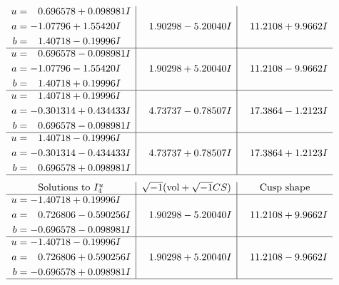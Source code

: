 \documentclass[1p]{elsarticle_modified}
\theoremstyle{definition}
\newcommand{\I}{\sqrt{-1}}
\begin{document}
$$\begin{array}{c|c|c}
\begin{aligned}
u &= \phantom{-}0.696578 + 0.098981 I \\
a &= -1.07796 + 1.55420 I \\
b &= \phantom{-}1.40718 - 0.19996 I\end{aligned}
 & \phantom{-}1.90298 - 5.20040 I & \phantom{-}11.2108 + 9.9662 I \\ \hline\begin{aligned}
u &= \phantom{-}0.696578 - 0.098981 I \\
a &= -1.07796 - 1.55420 I \\
b &= \phantom{-}1.40718 + 0.19996 I\end{aligned}
 & \phantom{-}1.90298 + 5.20040 I & \phantom{-}11.2108 - 9.9662 I \\ \hline\begin{aligned}
u &= \phantom{-}1.40718 + 0.19996 I \\
a &= -0.301314 + 0.434433 I \\
b &= \phantom{-}0.696578 - 0.098981 I\end{aligned}
 & \phantom{-}4.73737 - 0.78507 I & \phantom{-}17.3864 - 1.2123 I \\ \hline\begin{aligned}
u &= \phantom{-}1.40718 - 0.19996 I \\
a &= -0.301314 - 0.434433 I \\
b &= \phantom{-}0.696578 + 0.098981 I\end{aligned}
 & \phantom{-}4.73737 + 0.78507 I & \phantom{-}17.3864 + 1.2123 I\\
 \hline 
 \end{array}$$\newpage$$\begin{array}{c|c|c}  
\text{Solutions to }I^u_{4}& \I (\text{vol} + \sqrt{-1}CS) & \text{Cusp shape}\\
 \hline 
\begin{aligned}
u &= -1.40718 + 0.19996 I \\
a &= \phantom{-}0.726806 - 0.590256 I \\
b &= -0.696578 - 0.098981 I\end{aligned}
 & \phantom{-}1.90298 - 5.20040 I & \phantom{-}11.2108 + 9.9662 I \\ \hline\begin{aligned}
u &= -1.40718 - 0.19996 I \\
a &= \phantom{-}0.726806 + 0.590256 I \\
b &= -0.696578 + 0.098981 I\end{aligned}
 & \phantom{-}1.90298 + 5.20040 I & \phantom{-}11.2108 - 9.9662 I\\
 \hline 
 \end{array}$$\newpage\newpage\renewcommand{\arraystretch}{1}
\end{document}
